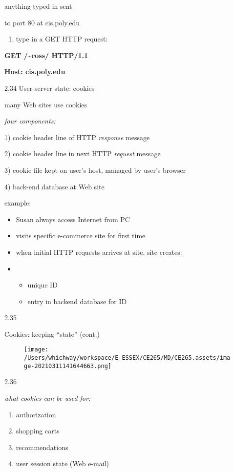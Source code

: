 \documentclass[
]{article}
\begin{document}
anything typed in sent

to port 80 at cis.poly.edu

\begin{enumerate}
\def\labelenumi{\arabic{enumi}.}
\item
  type in a GET HTTP request:
\end{enumerate}

\textbf{GET /\textasciitilde ross/ HTTP/1.1}

\textbf{Host: cis.poly.edu}

2.34 User-server state: cookies

many Web sites use cookies

\emph{four components:}

1) cookie header line of HTTP \emph{response} message

2) cookie header line in next HTTP \emph{request} message

3) cookie file kept on user's host, managed by user's browser

4) back-end database at Web site

example:

\begin{itemize}
\item
  Susan always access Internet from PC
\item
  visits specific e-commerce site for first time
\item
  when initial HTTP requests arrives at site, site creates:
\item
  \begin{itemize}
  \item
    unique ID
  \item
    entry in backend database for ID
  \end{itemize}
\end{itemize}

2.35

Cookies: keeping ``state'' (cont.)

\begin{figure}
\centering
\texttt{[image: /Users/whichway/workspace/E\_ESSEX/CE265/MD/CE265.assets/image-20210311141644663.png]}
\caption{}
\end{figure}

2.36

\emph{what cookies can be used for:}

\begin{enumerate}
\def\labelenumi{\arabic{enumi}.}
\item
  authorization
\item
  shopping carts
\item
  recommendations
\item
  user session state (Web e-mail)
\end{enumerate}
\end{document}
